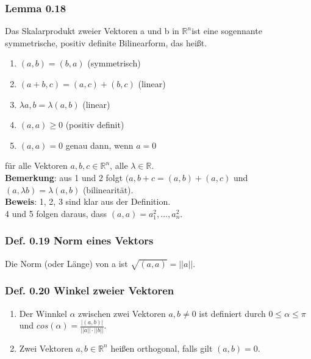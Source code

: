 \documentclass{scrartcl}
\newcommand{\lb}{\lambda}
\newcommand{\R}{\mathbb{R}}
\newcommand{\Rn}{\mathbb{R}^n}
\newcommand{\mRn}{\(\mathbb{R}^n\)}
\newcommand{\al}{\alpha}
\begin{document}
\subsubsection{Lemma 0.18}
Das Skalarprodukt zweier Vektoren a und b in \mRn ist eine sogennante symmetrische, positiv definite Bilinearform, das hei\ss{}t.
\begin{enumerate}
\item{\((a, b) = (b, a)\) (symmetrisch)}
\item{\((a + b, c) = (a, c) + (b, c)\) (linear)}
\item{\(\lb a, b = \lb(a, b)\) (linear)}
\item{\((a, a) \ge 0\) (positiv definit)}
\item{\((a, a) = 0\) genau dann, wenn \(a=0\)}
\end{enumerate}
f\"ur alle Vektoren \(a, b, c \in \Rn\), alle \(\lb \in \R\).\\
\textbf{Bemerkung}: aus 1 und 2 folgt \((a, b+c = (a,b) + (a,c)\) und \((a, \lb b) = \lb (a, b)\) (bilinearit\"at).\\
\textbf{Beweis}: 1, 2, 3 sind klar aus der Definition.\\
4 und 5 folgen daraus, dass \((a, a) = a_1^2, \dots, a_n^2\).\\

\subsubsection{Def. 0.19 Norm eines Vektors}
Die Norm (oder L\"ange) von a ist \(\sqrt{(a, a)} = ||a||\).

\subsubsection{Def. 0.20 Winkel zweier Vektoren}
\begin{enumerate}
\item {
Der Winnkel \(\al\) zwischen zwei Vektoren \(a, b \neq 0\) ist definiert durch \(0 \le \al \le \pi\) und \(cos(\al) = \frac{|(a,b)|}{||a||\cdot ||b||}\).}
\item{
Zwei Vektoren \(a, b \in \R^n\) hei\ss{}en orthogonal, falls gilt \((a, b) = 0\).
}
\end{enumerate}
\end{document}
